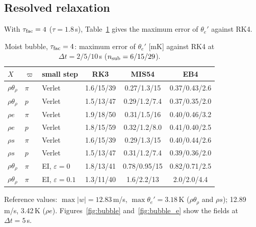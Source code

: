 \documentclass[11pt,a4paper]{article}
\newcommand{\dt}{\Delta t}
\newcommand{\pv}{\varpi}      %
\begin{document}
\subsection{Resolved relaxation}
With $\tau_{\rm fac}=4$ ($\tau=1.8$\,s), Table~\ref{tab:bubble} gives the maximum error of $\theta_e'$ against RK4.
\begin{table}[htbp]\centering\small
\caption{Moist bubble, $\tau_{\rm fac}=4$: maximum error of $\theta_e'$ [mK] against RK4 at $\dt=2/5/10$\,s ($n_{\rm sub}=6/15/29$).}\label{tab:bubble}
\begin{tabular}{lllccc}\toprule
$X$ & $\pv$ & small step & RK3 & MIS54 & EB4\\\midrule
$\rho\theta_\rho$ & $\pi$ & Verlet & 1.6/15/39 & 0.27/1.3/15 & 0.37/0.43/2.6\\
$\rho\theta_\rho$ & $p$ & Verlet & 1.5/13/47 & 0.29/1.2/7.4 & 0.37/0.35/2.0\\
$\rho e$ & $\pi$ & Verlet & 1.9/18/50 & 0.31/1.5/16 & 0.40/0.46/3.2\\
$\rho e$ & $p$ & Verlet & 1.8/15/59 & 0.32/1.2/8.0 & 0.41/0.40/2.5\\
$\rho s$ & $\pi$ & Verlet & 1.6/15/39 & 0.29/1.3/15 & 0.40/0.44/2.6\\
$\rho s$ & $p$ & Verlet & 1.5/13/47 & 0.31/1.2/7.4 & 0.39/0.36/2.0\\\midrule
$\rho\theta_\rho$ & $\pi$ & EI, $\varepsilon=0$ & 1.8/13/41 & 0.78/0.95/15 & 0.82/0.71/2.5\\
$\rho\theta_\rho$ & $\pi$ & EI, $\varepsilon=0.1$ & 1.3/11/40 & 1.6/2.2/13 & 2.0/2.0/4.4\\
\bottomrule
\end{tabular}
\end{table}
Reference values: $\max|w|=12.83$\,m/s, $\max\theta_e'=3.18$\,K ($\rho\theta_\rho$ and $\rho s$); 12.89\,m/s, 3.42\,K ($\rho e$).
Figures~\ref{fig:bubble} and~\ref{fig:bubble_e} show the fields at $\dt=5$\,s.
\end{document}
